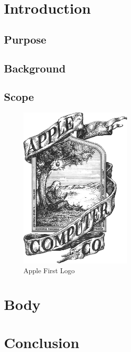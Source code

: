 \documentclass[12pt,a4paper]{report}
\begin{document}
\section{Introduction}

\subsection{Purpose}

\subsection{Background}

\subsection{Scope}

	\begin{figure}[h!]
		\centering
		\includegraphics[width=0.5\textwidth]{Apple_first_logo.png}
		\caption{Apple First Logo}
	\end{figure}
	
\section{Body}

\section{Conclusion}
\end{document}
